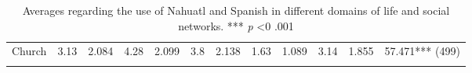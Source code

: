 \documentclass[output=paper,hidelinks]{langscibook}
\begin{document}
\begin{sidewaystable}
{\begin{tabular}{@{}llllllllllll@{}}
Church                                                                        & 3.13                                                            & 2.084 & 4.28                                                     & 2.099 & 3.8                                                          & 2.138 & 1.63                                                    & 1.089 & 3.14                                                     & 1.855 & 57.471*** (499) \\ \lspbottomrule
\end{tabular}
}
\caption{\label{tab:olko:1}Averages regarding the use of Nahuatl and Spanish in different domains of life and social networks. *** \textit{p} <0 .001}
\end{sidewaystable}

\end{document}
